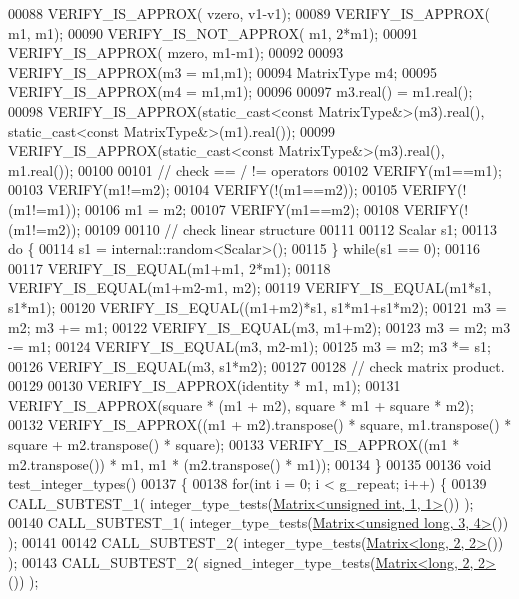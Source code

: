 \begin{DoxyCode}
00088   VERIFY\_IS\_APPROX(               vzero, v1-v1);
00089   VERIFY\_IS\_APPROX(               m1,    m1);
00090   VERIFY\_IS\_NOT\_APPROX(           m1,    2*m1);
00091   VERIFY\_IS\_APPROX(               mzero, m1-m1);
00092 
00093   VERIFY\_IS\_APPROX(m3 = m1,m1);
00094   MatrixType m4;
00095   VERIFY\_IS\_APPROX(m4 = m1,m1);
00096 
00097   m3.real() = m1.real();
00098   VERIFY\_IS\_APPROX(static\_cast<const MatrixType&>(m3).real(), static\_cast<const MatrixType&>(m1).real());
00099   VERIFY\_IS\_APPROX(static\_cast<const MatrixType&>(m3).real(), m1.real());
00100 
00101   \textcolor{comment}{// check == / != operators}
00102   VERIFY(m1==m1);
00103   VERIFY(m1!=m2);
00104   VERIFY(!(m1==m2));
00105   VERIFY(!(m1!=m1));
00106   m1 = m2;
00107   VERIFY(m1==m2);
00108   VERIFY(!(m1!=m2));
00109 
00110   \textcolor{comment}{// check linear structure}
00111 
00112   Scalar s1;
00113   \textcolor{keywordflow}{do} \{
00114     s1 = internal::random<Scalar>();
00115   \} \textcolor{keywordflow}{while}(s1 == 0);
00116 
00117   VERIFY\_IS\_EQUAL(m1+m1,                   2*m1);
00118   VERIFY\_IS\_EQUAL(m1+m2-m1,                m2);
00119   VERIFY\_IS\_EQUAL(m1*s1,                   s1*m1);
00120   VERIFY\_IS\_EQUAL((m1+m2)*s1,              s1*m1+s1*m2);
00121   m3 = m2; m3 += m1;
00122   VERIFY\_IS\_EQUAL(m3,                      m1+m2);
00123   m3 = m2; m3 -= m1;
00124   VERIFY\_IS\_EQUAL(m3,                      m2-m1);
00125   m3 = m2; m3 *= s1;
00126   VERIFY\_IS\_EQUAL(m3,                      s1*m2);
00127 
00128   \textcolor{comment}{// check matrix product.}
00129 
00130   VERIFY\_IS\_APPROX(identity * m1, m1);
00131   VERIFY\_IS\_APPROX(square * (m1 + m2), square * m1 + square * m2);
00132   VERIFY\_IS\_APPROX((m1 + m2).transpose() * square, m1.transpose() * square + m2.transpose() * square);
00133   VERIFY\_IS\_APPROX((m1 * m2.transpose()) * m1, m1 * (m2.transpose() * m1));
00134 \}
00135 
00136 \textcolor{keywordtype}{void} test\_integer\_types()
00137 \{
00138   \textcolor{keywordflow}{for}(\textcolor{keywordtype}{int} i = 0; i < g\_repeat; i++) \{
00139     CALL\_SUBTEST\_1( integer\_type\_tests(\hyperlink{group___core___module_class_eigen_1_1_matrix}{Matrix<unsigned int, 1, 1>}()) );
00140     CALL\_SUBTEST\_1( integer\_type\_tests(\hyperlink{group___core___module_class_eigen_1_1_matrix}{Matrix<unsigned long, 3, 4>}()) );
00141 
00142     CALL\_SUBTEST\_2( integer\_type\_tests(\hyperlink{group___core___module_class_eigen_1_1_matrix}{Matrix<long, 2, 2>}()) );
00143     CALL\_SUBTEST\_2( signed\_integer\_type\_tests(\hyperlink{group___core___module_class_eigen_1_1_matrix}{Matrix<long, 2, 2>}()) );

\end{DoxyCode}
